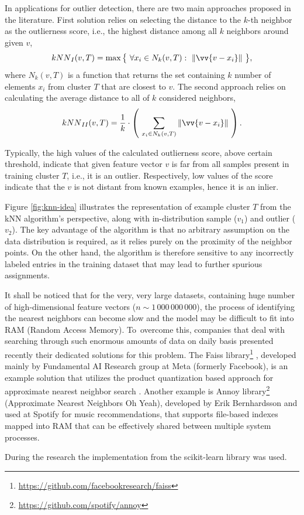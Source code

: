 In applications for outlier detection, there are two main approaches proposed in the literature. First solution relies on selecting the distance to the $k$-th neighbor as the outlierness score, i.e., the highest distance among all $k$ neighbors around given $v$,
\begin{equation}
    {kNN}_{I}(v, T)
    =
    \max\big\{
        ~
        \forall x_i \in N_k(v, T): ~ \norm{\vv{v - x_i}}
        ~
    \big\}
    ,
    \label{eq:kNN-max}
\end{equation}
where $N_k(v, T)$ is a function that returns the set containing $k$ number of elements $x_i$ from cluster $T$ that are closest to $v$. The second approach relies on calculating the average distance to all of $k$ considered neighbors,
\begin{equation}
    {kNN}_{II}(v, T)
    =
    \frac{1}{k}
    \cdot
    \left(
        ~
        \sum_{x_i \in N_k(v, T)} \norm{\vv{v - x_i}}
        ~
    \right)
    .
    \label{eq:kNN-avg}
\end{equation}

Typically, the high values of the calculated outlierness score, above certain threshold, indicate that given feature vector $v$ is far from all samples present in training cluster $T$, i.e., it is an outlier. Respectively, low values of the score indicate that the $v$ is not distant from known examples, hence it is an inlier.

Figure \ref{fig:knn-idea} illustrates the representation of example cluster $T$ from the kNN algorithm's perspective, along with in-distribution sample ($v_1$) and outlier ($v_2$). The key advantage of the algorithm is that no arbitrary assumption on the data distribution is required, as it relies purely on the proximity of the neighbor points. On the other hand, the algorithm is therefore sensitive to any incorrectly labeled entries in the training dataset that may lead to further spurious assignments.

It shall be noticed that for the very, very large datasets, containing huge number of high-dimensional feature vectors ($n \sim 1\,000\,000\,000$), the process of identifying the nearest neighbors can become slow and the model may be difficult to fit into RAM (Random Access Memory). To~overcome this, companies that deal with searching through such enormous amounts of data on daily basis presented recently their dedicated solutions for this problem. The Faiss library\footnote{\url{https://github.com/facebookresearch/faiss}} \cite{Douze-2024}, developed mainly by Fundamental AI Research group at Meta (formerly Facebook), is an example solution that utilizes the product quantization based approach for approximate nearest neighbor search \cite{Jegou-2011}. Another example is Annoy library\footnote{\url{https://github.com/spotify/annoy}} (Approximate Nearest Neighbors Oh Yeah), developed by Erik Bernhardsson and used at Spotify for music recommendations, that supports file-based indexes mapped into RAM that can be effectively shared between multiple system processes.

During the research the implementation from the scikit-learn library \cite{scikit-learn} was used.
